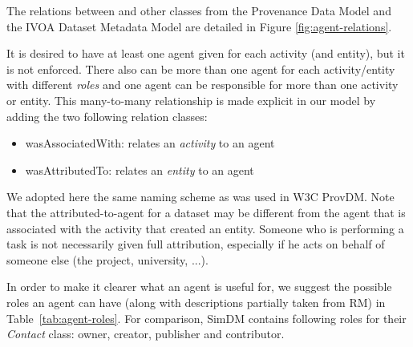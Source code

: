 The relations between  and other classes from the Provenance Data Model and
the IVOA Dataset Metadata Model are detailed in Figure \ref{fig:agent-relations}.

It is desired to have at least one agent given for each activity (and entity), but it
is not enforced.
There also can be more than one agent for each activity/entity with different \emph{roles} 
and one agent can be responsible for more than one activity or entity. This 
many-to-many relationship is made explicit in our model by adding the two
following relation classes:

\begin{itemize}
\item wasAssociatedWith: relates an \emph{activity} to an agent
\item wasAttributedTo: relates an \emph{entity} to an agent
\end{itemize}

We adopted here the same naming scheme as was used in W3C ProvDM.
Note that the attributed-to-agent for a dataset may be different from the 
agent that is associated with the activity that created an entity. 
Someone who is performing a task is not necessarily given full attribution, 
especially if he acts on behalf of someone else (the project, university, ...).

In order to make it clearer what an agent is useful for, we suggest the
possible roles an agent can have (along with descriptions partially taken from RM)
in Table~\ref{tab:agent-roles}. 
For comparison, SimDM contains following roles 
for their \emph{Contact} class: 
owner, creator, publisher and contributor.


